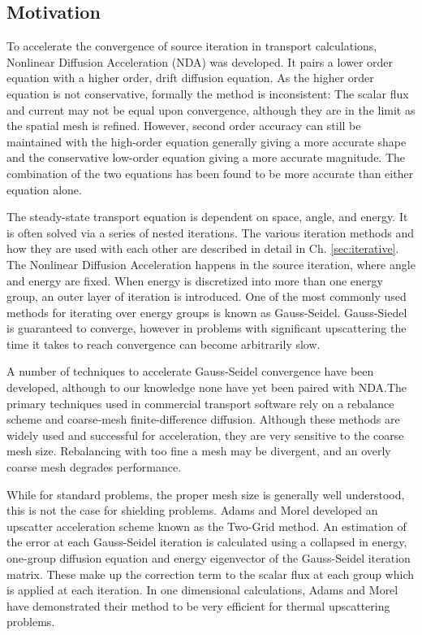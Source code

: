 \subsection{Motivation}
To accelerate the convergence of source iteration in transport calculations, Nonlinear Diffusion Acceleration (NDA) was developed. It pairs a lower order equation with a higher order, drift diffusion equation. As the higher order equation is not conservative, formally the method is inconsistent: The scalar flux and current may not be equal upon convergence, although they are in the limit as the spatial mesh is refined. However, second order accuracy can still be maintained with the high-order equation generally giving a more accurate shape and the conservative low-order equation giving a more accurate magnitude. The combination of the two equations has been found to be more accurate than either equation alone. \cite{morel-holo} \par
The steady-state transport equation is dependent on space, angle, and energy. It is often solved via a series of nested iterations. The various iteration methods and how they are used with each other are described in detail in Ch. \ref{sec:iterative}. The Nonlinear Diffusion Acceleration happens in the source iteration, where angle and energy are fixed. When energy is discretized into more than one energy group, an outer layer of iteration is introduced. One of the most commonly used methods for iterating over energy groups is known as Gauss-Seidel. Gauss-Siedel is guaranteed to converge, however in problems with significant upscattering the time it takes to reach convergence can become arbitrarily slow. 
\par
A number of techniques to accelerate Gauss-Seidel convergence have been developed, although to our knowledge none have yet been paired with NDA.The primary techniques used in commercial transport software rely on a rebalance scheme and coarse-mesh finite-difference diffusion. Although these methods are widely used and successful for acceleration, they are very sensitive to the coarse mesh size. Rebalancing with too fine a mesh may be divergent, and an overly coarse mesh degrades performance. \cite{evans-upscat}
\par
While for standard problems, the proper mesh size is generally well understood, this is not the case for shielding problems. Adams and Morel developed an upscatter acceleration scheme known as the Two-Grid method. An estimation of the error at each Gauss-Seidel iteration is calculated using a collapsed in energy, one-group diffusion equation and energy eigenvector of the Gauss-Seidel iteration matrix. These make up the correction term to the scalar flux at each group which is applied at each iteration. In one dimensional calculations, Adams and Morel have demonstrated their method to be very efficient for thermal upscattering problems. \cite{morel-upscat}

